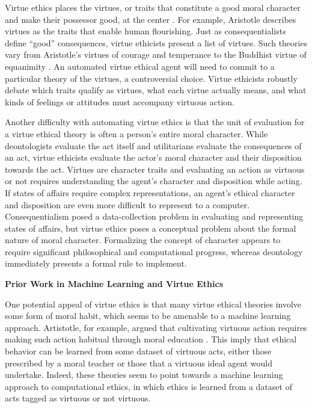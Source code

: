 \begin{isabellebody}
\isadelimdocument
%
\endisadelimdocument
%
\isatagdocument
%
\isamarkuptrue%
%
\endisatagdocument
{\isafolddocument}%
%
\isadelimdocument
%
\endisadelimdocument
%
\begin{isamarkuptext}%
Virtue ethics places the virtues, or traits that constitute a good moral character and make 
their possessor good, at the center \cite{vesep}. For example, Aristotle describes virtues as the 
traits that enable human flourishing. Just as consequentialists define ``good'' consequences, virtue 
ethicists present a list of virtues. Such theories vary from Aristotle's virtues of courage and 
temperance \citet{aristotle} to the Buddhist virtue of equanimity \citet{mcrae}. An automated virtue 
ethical agent will need to commit to a particular theory of the virtues, a controversial choice. 
Virtue ethicists robustly debate which traits qualify as virtues, what each virtue actually means, and 
what kinds of feelings or attitudes must accompany virtuous action.%
\end{isamarkuptext}\isamarkuptrue%
%
\begin{isamarkuptext}%
Another difficulty with automating virtue ethics is that the unit of evaluation for a virtue ethical
theory is often a person's entire moral character. While deontologists evaluate the act itself and utilitarians
evaluate the consequences of an act, virtue ethicists evaluate the actor's moral character and their 
disposition towards the act. Virtues are character traits and evaluating an action as virtuous or 
not requires understanding the agent's character and disposition while acting. If states of affairs
require complex representations, an agent's ethical character and disposition are even more difficult
to represent to a computer. Consequentialism posed a data-collection problem in evaluating and representing states
of affairs, but virtue ethics poses a conceptual problem about the formal nature of moral character.
Formalizing the concept of character appears to require significant philosophical and computational
progress, whereas deontology immediately presents a formal rule to implement.%
\end{isamarkuptext}\isamarkuptrue%
%
\begin{isamarkuptext}%
\noindent \textbf{Prior Work in Machine Learning and Virtue Ethics}%
\end{isamarkuptext}\isamarkuptrue%
%
\begin{isamarkuptext}%
One potential appeal of virtue ethics is that many virtue ethical theories involve some form of 
moral habit, which seems to be amenable to a machine learning approach. Artistotle, for example, argued 
that cultivating virtuous action requires making such action habitual through moral education \citep{aristotle}. This
imply that ethical behavior can be learned from some dataset of virtuous acts, either those 
prescribed by a moral teacher or those that a virtuous ideal agent would undertake. Indeed, these 
theories seem to point towards a machine learning approach to computational ethics, in which ethics is 
learned from a dataset of acts tagged as virtuous or not virtuous. 


\end{isamarkuptext}
\end{isabellebody}
